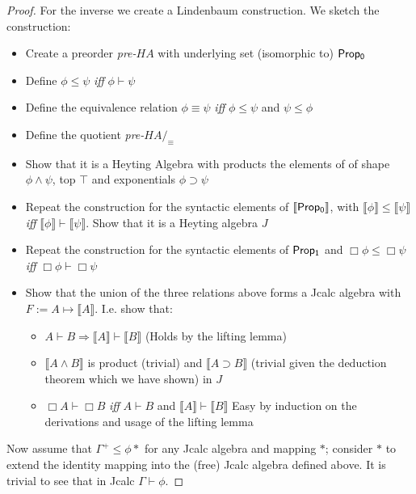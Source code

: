 \begin{proof}
    For the inverse we create a Lindenbaum construction. We sketch the construction:
    \begin{itemize}
        \item Create a preorder \textit{pre-}$HA$ with underlying set (isomorphic to) ${\sf Prop_0}$
        \item Define $\phi\le\psi$ {\textit{iff}} $\phi\vdash\psi$
        \item Define the equivalence relation $\phi\equiv\psi$ {\textit{iff}} 
        $\phi\le\psi$ and $\psi\le\phi$
        \item Define the quotient \textit{pre-}$HA/_{\equiv}$
        \item Show that it is a Heyting Algebra with products the elements of
        of shape $\phi\wedge\psi$, top $\top$ and exponentials $\phi\supset\psi$
        \item Repeat the construction for the syntactic elements of 
        $\llbracket {\sf Prop_0} \rrbracket$, with 
        $\llbracket\phi\rrbracket\le\llbracket\psi\rrbracket$ 
        \textit{iff} $\llbracket\phi\rrbracket\vdash\llbracket\psi\rrbracket$.
        Show that it is a Heyting algebra $J$
        \item Repeat the construction for the syntactic elements of
         ${\sf Prop_1}$ and $\Box \phi\le\Box\psi$ \textit{iff} $\Box\phi\vdash\Box\psi$
        \item Show that the union of the three relations above forms a 
        Jcalc algebra with $F:= A\mapsto \llbracket A\rrbracket$. I.e. show that:
        \begin{itemize}
            \item $A\vdash B\Rightarrow \llbracket A\rrbracket\vdash \llbracket B\rrbracket$
            (Holds by the lifting lemma)
            \item $\llbracket A\wedge B\rrbracket $ is product (trivial) and 
            $\llbracket A\supset B \rrbracket$ (trivial given the deduction theorem which we have shown)
            in $J$
            \item $\Box A\vdash\Box B$ \textit{iff} $A\vdash B$ and $\llbracket A\rrbracket \vdash \llbracket B\rrbracket$
            Easy by induction on the derivations and usage of the lifting lemma
        \end{itemize}
    \end{itemize}
    Now assume that $\Gamma^{+}\le\phi*$ for any Jcalc algebra and 
    mapping $*$; consider  $*$ to extend  the identity mapping  
    into the (free) Jcalc algebra defined above. 
    It is trivial to see that in Jcalc
    $\Gamma\vdash\phi$.
\end{proof}

